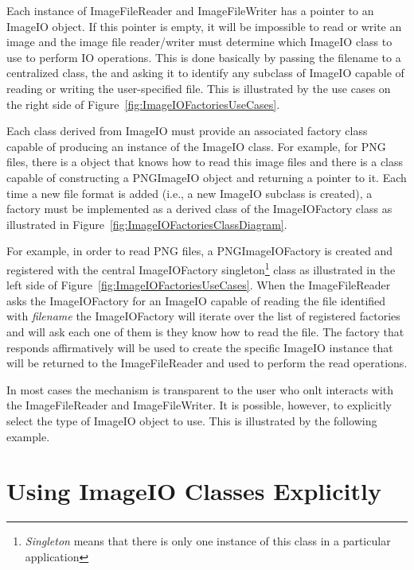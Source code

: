 Each instance of ImageFileReader and ImageFileWriter has
a pointer to an ImageIO object. If this pointer is empty, it will
be impossible to read or write an image and the image file reader/writer must
determine which ImageIO class to use to perform IO operations.
This is done basically by passing the filename to a centralized class, the
 and asking it to identify any subclass of
ImageIO capable of reading or writing the user-specified file. This
is illustrated by the use cases on the right side of
Figure~\ref{fig:ImageIOFactoriesUseCases}.

Each class derived from ImageIO must provide an associated factory
class capable of producing an instance of the ImageIO class. For
example, for PNG files, there is a  object that knows how
to read this image files and there is a  class
capable of constructing a PNGImageIO object and returning a pointer
to it.  Each time a new file format is added (i.e., a new ImageIO
subclass is created), a factory must be implemented as a derived class of the
ImageIOFactory class as illustrated in
Figure~\ref{fig:ImageIOFactoriesClassDiagram}.

For example, in order to read PNG files, a PNGImageIOFactory is
created and registered with the central ImageIOFactory
singleton\footnote{\emph{Singleton} means that there is only one instance of
this class in a particular application} class as illustrated in the left side
of Figure~\ref{fig:ImageIOFactoriesUseCases}. When the ImageFileReader asks
the ImageIOFactory for an ImageIO capable of reading the
file identified with \emph{filename} the ImageIOFactory will iterate over the
list of registered factories and will ask each one of them is they know how
to read the file. The factory that responds affirmatively will be used to
create the specific ImageIO instance that will be returned to the
ImageFileReader and used to perform the read operations.

In most cases the mechanism is transparent to the user who onlt interacts
with the ImageFileReader and ImageFileWriter. It is
possible, however, to explicitly select the type of ImageIO object
to use.  This is illustrated by the following example.


\section{Using ImageIO Classes Explicitly}
\label{sec:ImageReadExportVTK}




